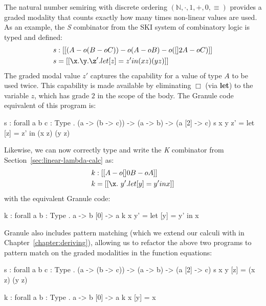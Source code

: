 \begin{example}
\label{ex:s-comb}
  The natural number semiring with discrete ordering $(\mathbb{N}, \cdot, 1, +,
  0, \equiv)$ provides a graded modality that counts exactly how many times
  non-linear values are used. As an example, the \emph{S} combinator from
  the SKI system of combinatory logic is typed and defined:
\begin{align*}
s & : [[ (A -o (B -o C)) -o {(A -o B) -o ({[] 2 A} -o C)} ]] \\
s & = [[ \x . {\y . {\z' . {let [ z ] = z' in {(x z) (y z)}}}} ]]
\end{align*}
The graded modal value $z'$ captures the capability for a value
of type $A$ to be used twice. This capability is made available by eliminating
$\Box$ (via \textbf{let}) to the variable $z$, which has
grade $2$ in the scope of the body. 
The Granule code equivalent of this program is:
\begin{granule}
s : forall { a b c : Type } 
  . (a -> (b -> c)) -> (a -> b) -> (a [2] -> c)
s x y z' = let [z] = z' in (x z) (y z)
\end{granule}
Likewise, we can now correctly type and write the \emph{K} combinator from
Section~\ref{sec:linear-lambda-calc} as:
\begin{align*}
k & : [[ {A -o [] 0 B} -o A ]] \\
k & = [[ \x . \ y' . {let [ y ] = y' in x }]]
\end{align*}
with the equivalent Granule code:
\begin{granule}
k : forall { a b : Type } . a -> b [0] -> a
k x y' = let [y] = y' in x
\end{granule}
Granule also includes pattern matching (which we extend our calculi with in
Chapter~\ref{chapter:deriving}), allowing us to refactor the above two programs
to pattern match on the graded modalities in the function equations:
\begin{granule}
s : forall { a b c : Type } 
  . (a -> (b -> c)) -> (a -> b) -> (a [2] -> c)
s x y [z] = (x z) (y z)

k : forall { a b : Type } . a -> b [0] -> a
k x [y] = x
\end{granule}


\end{example}
